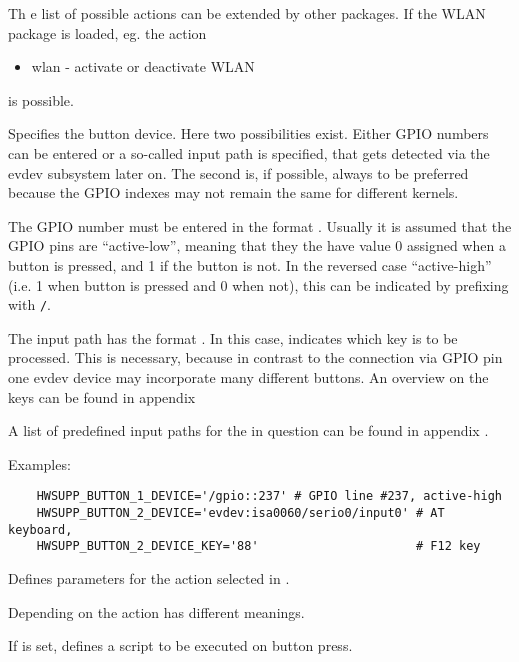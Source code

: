 \begin{description}
  Th
e list of possible actions can be extended by other packages.
  If the WLAN package is loaded, eg. the action 
  \begin{itemize}
    \item wlan - activate or deactivate WLAN
  \end{itemize}
  is possible.

  Specifies the button device. Here two possibilities exist. Either GPIO numbers 
  can be entered or a so-called input path is specified, that gets detected via 
  the evdev subsystem later on. The second is, if possible, always to be preferred 
  because the GPIO indexes may not remain the same for different kernels.

  The GPIO number must be entered in the format . Usually it is 
  assumed that the GPIO pins are ``active-low'', meaning that they the have value 
  0 assigned when a button is pressed, and 1 if the button is not. In the reversed 
  case ``active-high'' (i.e. 1 when button is pressed and 0 when not), this can be 
  indicated by prefixing with \texttt{/}.

  The input path has the format . In this case,
   indicates which key is to be processed. This is 
  necessary, because in contrast to the connection via GPIO pin one evdev device may 
  incorporate many different buttons. An overview on the keys can be found in appendix 

  A list of predefined input paths for the  in question 
  can be found in appendix .

  Examples:
  \begin{verbatim}
    HWSUPP_BUTTON_1_DEVICE='/gpio::237' # GPIO line #237, active-high
    HWSUPP_BUTTON_2_DEVICE='evdev:isa0060/serio0/input0' # AT keyboard,
    HWSUPP_BUTTON_2_DEVICE_KEY='88'                      # F12 key
  \end{verbatim}

  Defines parameters for the action selected in .
  
  Depending on the action  has different meanings.

  If  is set, 
   defines a script to be executed 
  on button press.
  

\end{description}
